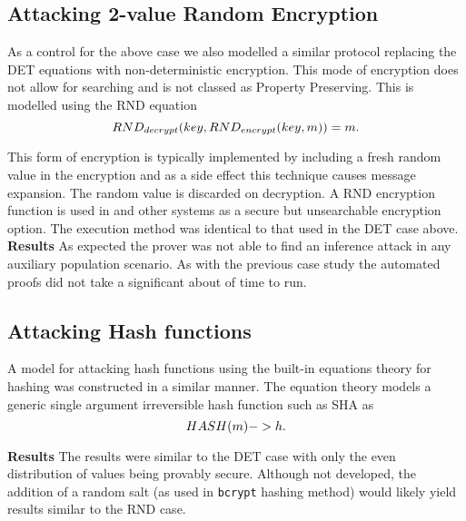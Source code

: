 \documentclass[journal]{IEEEtran}
\begin{document}
\subsection{Attacking 2-value Random Encryption}
As a control for the above case we also modelled a similar protocol replacing the DET equations with non-deterministic encryption.
This mode of encryption does not allow for searching and is not classed as Property Preserving. This is modelled using the RND equation\\ 

\begin{equation}
    RND_{decrypt}(key, RND_{encrypt}(key, m))=m.\\
\end{equation}

This form of encryption is typically implemented by including a fresh random value in the encryption and as a side effect this technique causes message expansion. The random value is discarded on decryption. A RND encryption function is used in \cite{Popa2011} and other systems as a secure but unsearchable encryption option.
The execution method was identical to that used in the DET case above.
\textbf{Results} As expected the prover was not able to find an inference attack in any auxiliary population scenario. As with the previous case study the automated proofs did not take a significant about of time to run.

\subsection{Attacking Hash functions}
A model for attacking hash functions using the built-in equations theory for hashing was constructed in a similar manner. The equation theory models a generic single argument irreversible hash function such as SHA as \\
\begin{equation}
    HASH(m) -> h.\\
\end{equation}

\textbf{Results} The results were similar to the DET case with only the even distribution of values being provably secure. Although not developed, the addition of a random salt (as used in \texttt{bcrypt} hashing method) would likely yield results similar to the RND case. 
\end{document}
